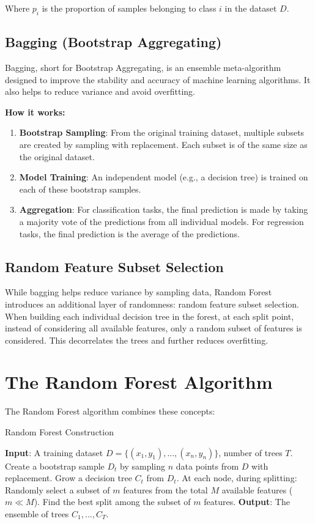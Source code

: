 \documentclass[12pt,a4paper]{article}
\begin{document}
Where $p_i$ is the proportion of samples belonging to class $i$ in the dataset $D$.

\subsection{Bagging (Bootstrap Aggregating)}

Bagging, short for Bootstrap Aggregating, is an ensemble meta-algorithm designed to improve the stability and accuracy of machine learning algorithms. It also helps to reduce variance and avoid overfitting.

\textbf{How it works:}
\begin{enumerate}
    \item \textbf{Bootstrap Sampling}: From the original training dataset, multiple subsets are created by sampling with replacement. Each subset is of the same size as the original dataset.
    \item \textbf{Model Training}: An independent model (e.g., a decision tree) is trained on each of these bootstrap samples.
    \item \textbf{Aggregation}: For classification tasks, the final prediction is made by taking a majority vote of the predictions from all individual models. For regression tasks, the final prediction is the average of the predictions.
\end{enumerate}

\subsection{Random Feature Subset Selection}

While bagging helps reduce variance by sampling data, Random Forest introduces an additional layer of randomness: random feature subset selection. When building each individual decision tree in the forest, at each split point, instead of considering all available features, only a random subset of features is considered. This decorrelates the trees and further reduces overfitting.

\section{The Random Forest Algorithm}

The Random Forest algorithm combines these concepts:

\begin{algorithm}
\caption{Random Forest Construction}
\begin{algorithmic}[1]
\STATE \textbf{Input}: A training dataset $D = \{(x_1, y_1), ..., (x_n, y_n)\}$, number of trees $T$.
    \STATE Create a bootstrap sample $D_t$ by sampling $n$ data points from $D$ with replacement.
    \STATE Grow a decision tree $C_t$ from $D_t$. At each node, during splitting:
    \STATE Randomly select a subset of $m$ features from the total $M$ available features ($m \ll M$).
    \STATE Find the best split among the subset of $m$ features.
\ENDFOR
\STATE \textbf{Output}: The ensemble of trees ${C_1, ..., C_T}$.
\end{algorithmic}
\end{algorithm}
\end{document}
